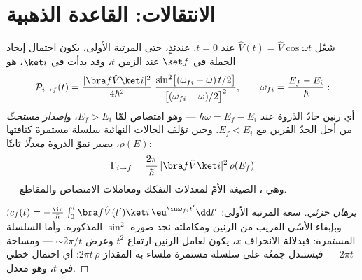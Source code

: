 \section{الانتقالات: القاعدة الذهبية}

\begin{theorem}\label{thm:b3:perturbation-theory:golden}
شغّل $\hat V(t) = \hat V\cos\omega t$ عند $t = 0$. عندئذٍ، حتى المرتبة
الأولى، يكون احتمال إيجاد الجملة في $\ket f$ عند الزمن
$t$، وقد بدأت في $\ket i$، هو
\[
\mathcal P_{i\to f}(t) = \frac{|\bra f\hat V\ket i|^2}{4\hbar^2}\;
\frac{\sin^2\!\big[(\omega_{fi} - \omega)\,t/2\big]}
{\big[(\omega_{fi} - \omega)/2\big]^2} ,
\qquad \omega_{fi} = \frac{E_f - E_i}{\hbar} :
\]
أي رنين حادّ الذروة عند $\hbar\omega = E_f - E_i$ ---
وهو امتصاص لمّا $E_f > E_i$، و\emph{إصدار مستحثّ} من أجل
الحدّ القرين مع $E_f < E_i$. وحين تؤلف الحالات النهائية
سلسلة مستمرة كثافتها $\rho(E)$، يصير نموّ الذروة \emph{معدلًا}
ثابتًا:
\[
\Gamma_{i\to f} = \frac{2\pi}{\hbar}\,
|\bra f\hat V\ket i|^2\,\rho(E_f)
\]
--- وهي \emph{}، الصيغة الأمّ لمعدلات التفكك
ومعاملات الامتصاص والمقاطع.
\end{theorem}

\begin{proof}[برهان جزئي]
سعة المرتبة الأولى: $c_f(t) = -\tfrac{\iu}{\hbar}\int_0^t\bra
f\hat V(t')\ket i\,\eu^{\iu\omega_{fi}t'}\dd t'$؛ وبإبقاء الأسّي
القريب من الرنين ومكاملته نجد صورة $\sin^2$
المذكورة. وأما السلسلة المستمرة: فبدلالة الانحراف
$x$، يكون لعامل الرنين ارتفاع $t^2$ وعرض $\sim 2\pi/t$
--- ومساحة $2\pi t$ --- فيستبدل جمعُه على سلسلة مستمرة ملساء
به المقدارَ $2\pi t\,\rho$: أي احتمال خطي في $t$، وهو معدل.
\end{proof}

